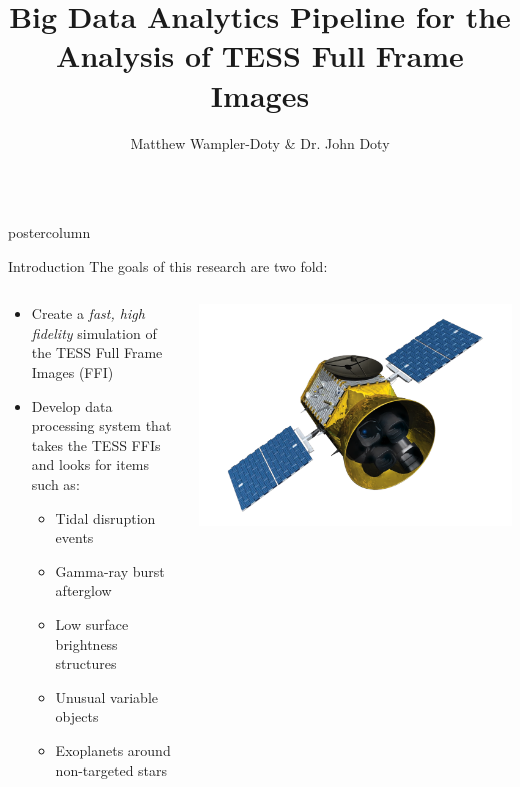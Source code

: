 \documentclass[final,hyperref={pdfpagelabels=false}]{beamer}
\title{\LARGE Big Data Analytics Pipeline for the Analysis of TESS Full Frame Images}
\author{Matthew Wampler-Doty \& Dr. John Doty}
\institute[Noqsi Aerospace]{Noqsi Aerospace, Ltd. \& MIT}
\date[]{}
\newlength{\columnheight}
\begin{document}
\begin{frame}
  \begin{columns}
    \begin{column}{.49\textwidth}
      \begin{beamercolorbox}[center,wd=\textwidth]{postercolumn}
        \begin{minipage}[T]{.95\textwidth}  %
          \parbox[t][\columnheight]{\textwidth}{
            \begin{block}{Introduction}
	    The goals of this research are two fold:
            \begin{columns}
	            \begin{column}{.70\textwidth}
		              \begin{itemize}
		              \item Create a \emph{fast, high fidelity} simulation of the TESS Full Frame Images (FFI)
		              \item Develop data processing system that takes the TESS FFIs and looks for items such as:
		              \begin{itemize}
		              	\item Tidal disruption events
			        \item Gamma-ray burst afterglow
				\item Low surface brightness structures
				\item Unusual variable objects
				\item Exoplanets around non-targeted stars
		              \end{itemize}
		              \end{itemize}
		     \end{column}
		     \begin{column}{.28\textwidth}
		     \includegraphics[width=0.80\linewidth]{figures/TESS.png}
		     \end{column}         
              \end{columns}
            \end{block}

}
\end{minipage}
\end{beamercolorbox}
\end{column}
\end{columns}
\end{frame}
\end{document}
